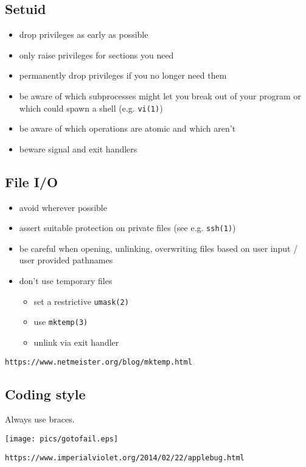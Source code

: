 \documentclass[xga]{xdvislides}
\begin{document}
\subsection{Setuid}
\begin{itemize}
	\item drop privileges as early as possible
	\item only raise privileges for sections you need
	\item permanently drop privileges if you no longer need them
	\item be aware of which subprocesses might let you break out of your program or which could spawn a shell (e.g. \verb+vi(1)+)
	\item be aware of which operations are atomic and which aren't
	\item beware signal and exit handlers
\end{itemize}

\subsection{File I/O}

\begin{itemize}
	\item avoid wherever possible
	\item assert suitable protection on private files (see e.g. \verb+ssh(1)+)
	\item be careful when opening, unlinking, overwriting files based on user input / user provided pathnames
	\item don't use temporary files
		\begin{itemize}
			\item set a restrictive \verb+umask(2)+
			\item use \verb+mktemp(3)+
			\item unlink via exit handler
		\end{itemize}
\end{itemize}

\verb+https://www.netmeister.org/blog/mktemp.html+

\subsection{Coding style}
Always use braces.
\begin{center}
        \texttt{[image: pics/gotofail.eps]}
\end{center}
\verb+https://www.imperialviolet.org/2014/02/22/applebug.html+
\end{document}
